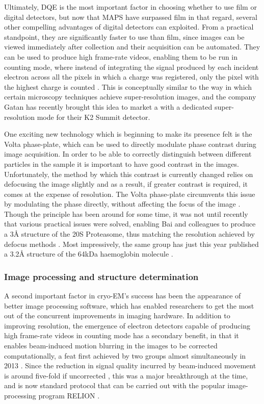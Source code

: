 \documentclass[a4paper,11pt,twoside,openright]{scrbook}
\begin{document}
Ultimately, DQE is the most important factor in choosing whether to use film or
digital detectors, but now that MAPS have surpassed film in that regard, several
other compelling advantages of digital detectors can exploited. From a practical
standpoint, they are significantly faster to use than film, since images can be
viewed immediately after collection and their acquisition can be automated. They
can be used to produce high frame-rate videos, enabling them to be run in
counting mode, where instead of integrating the signal produced by each incident
electron across all the pixels in which a charge was registered, only the pixel
with the highest charge is counted \cite{McMullan2009a}. This is conceptually
similar to the way in which certain microscopy techniques achieve
super-resolution images, and the company Gatan has recently brought this idea to
market a with a dedicated super-resolution mode for their K2 Summit detector.

One exciting new technology which is beginning to make its presence felt is the
Volta phase-plate, which can be used to directly modulate phase contrast during
image acquisition. In order to be able to correctly distinguish between
different particles in the sample it is important to have good contrast in the
images. Unfortunately, the method by which this contrast is currently changed
relies on defocusing the image slightly and as a result, if greater contrast is
required, it comes at the expense of resolution. The Volta phase-plate
circumvents this issue by modulating the phase directly, without affecting the
focus of the image \cite{Danev2014}. Though the principle has been around for
some time, it was not until recently that various practical issues were solved,
enabling Bai and colleagues to produce a 3Å structure of the 20S Proteasome,
thus matching the resolution achieved by defocus methods \cite{Danev2016}. Most
impressively, the same group has just this year published a 3.2Å structure of
the 64kDa haemoglobin molecule \cite{Khoshouei2017}.

\subsubsection{Image processing and structure determination}
A second important factor in cryo-EM's success has been the appearance of better
image processing software, which has enabled researchers to get the most out of
the concurrent improvements in imaging hardware. In addition to improving
resolution, the emergence of electron detectors capable of producing high
frame-rate videos in counting mode has a secondary benefit, in that it enables
beam-induced motion blurring in the images to be corrected computationally, a
feat first achieved by two groups almost simultaneously in 2013 \cite{Bai2013,
Li2013}. Since the reduction in signal quality incurred by beam-induced movement
is around five-fold if uncorrected \cite{Henderson1985}, this was a major
breakthrough at the time, and is now standard protocol that can be carried out
with the popular image-processing program RELION \cite{Scheres2012,Scheres2014}.
\end{document}
